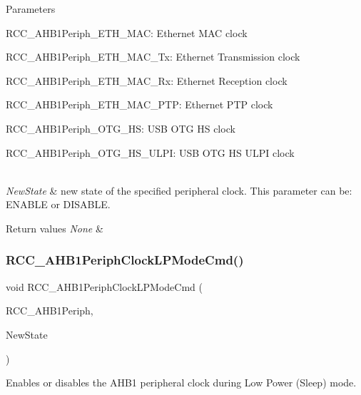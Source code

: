\begin{DoxyParams}{Parameters}
\begin{DoxyItemize}
 \item R\+C\+C\+\_\+\+A\+H\+B1\+Periph\+\_\+\+E\+T\+H\+\_\+\+M\+AC\+: Ethernet M\+AC clock \item R\+C\+C\+\_\+\+A\+H\+B1\+Periph\+\_\+\+E\+T\+H\+\_\+\+M\+A\+C\+\_\+\+Tx\+: Ethernet Transmission clock \item R\+C\+C\+\_\+\+A\+H\+B1\+Periph\+\_\+\+E\+T\+H\+\_\+\+M\+A\+C\+\_\+\+Rx\+: Ethernet Reception clock \item R\+C\+C\+\_\+\+A\+H\+B1\+Periph\+\_\+\+E\+T\+H\+\_\+\+M\+A\+C\+\_\+\+P\+TP\+: Ethernet P\+TP clock \item R\+C\+C\+\_\+\+A\+H\+B1\+Periph\+\_\+\+O\+T\+G\+\_\+\+HS\+: U\+SB O\+TG HS clock \item R\+C\+C\+\_\+\+A\+H\+B1\+Periph\+\_\+\+O\+T\+G\+\_\+\+H\+S\+\_\+\+U\+L\+PI\+: U\+SB O\+TG HS U\+L\+PI clock \end{DoxyItemize}
\\
\hline
{\em New\+State} & new state of the specified peripheral clock. This parameter can be\+: E\+N\+A\+B\+LE or D\+I\+S\+A\+B\+LE. \\
\hline
\end{DoxyParams}

\begin{DoxyRetVals}{Return values}
{\em None} & \\
\hline
\end{DoxyRetVals}
\mbox{\label{group___r_c_c_ga5cd0d5adbc7496d7005b208bd19ce255}} 
\subsubsection{\texorpdfstring{R\+C\+C\+\_\+\+A\+H\+B1\+Periph\+Clock\+L\+P\+Mode\+Cmd()}{RCC\_AHB1PeriphClockLPModeCmd()}}
{\footnotesize\ttfamily void R\+C\+C\+\_\+\+A\+H\+B1\+Periph\+Clock\+L\+P\+Mode\+Cmd (\begin{DoxyParamCaption}\item[{uint32\+\_\+t}]{R\+C\+C\+\_\+\+A\+H\+B1\+Periph,  }\item[{Functional\+State}]{New\+State }\end{DoxyParamCaption})}



Enables or disables the A\+H\+B1 peripheral clock during Low Power (Sleep) mode. 

